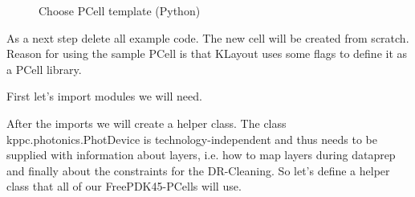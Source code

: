 \documentclass[a4paper,10pt,english]{sphinxmanual}
\begin{document}
\begin{figure}[htbp]
\centering
\capstart

\noindent{}
\caption{Choose PCell template (Python)}\label{\detokenize{example_library:id3}}\end{figure}

As a next step delete all example code. The new cell will be created from scratch. Reason for using the sample PCell is that KLayout
uses some flags to define it as a PCell library.

First let’s import modules we will need.

%
\begin{sphinxVerbatim}[commandchars=\\\{\},numbers=left,firstnumber=1,stepnumber=1]
 
 
    
   
   
 
\end{sphinxVerbatim}

After the imports we will create a helper class. The class kppc.photonics.PhotDevice is technology-independent and
thus needs to be supplied with information about layers, i.e. how to map layers during dataprep and finally about
the constraints for the DR-Cleaning. So let’s define a helper class that all of our FreePDK45-PCells will use.
\end{document}
